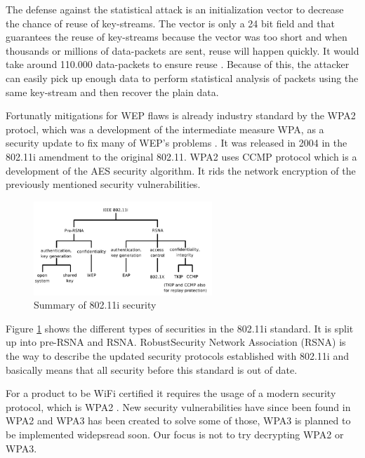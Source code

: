 The defense against the statistical attack is an initialization vector to decrease the chance of reuse of key-streams. The vector is only a 24 bit field and that guarantees the reuse of key-streams because the vector was too short and when thousands or millions of data-packets are sent, reuse will happen quickly. It would take around 110.000 data-packets to ensure reuse \cite{Random_map}. Because of this, the attacker can easily pick up enough data to perform statistical analysis of packets using the same key-stream and then recover the plain data.

Fortunatly mitigations for WEP flaws is already industry standard by the WPA2 protocl, which was a development of the intermediate measure WPA, as a security update to fix many of WEP's problems \cite{WPA2_1}\cite{WEP3}. It was released in 2004 in the 802.11i amendment to the original 802.11. WPA2 uses CCMP protocol which is a development of the AES security algorithm. It rids the network encryption of the previously mentioned security vulnerabilities. 
\\
\begin{figure}[!htbp]
    \centering
    \includegraphics[width=0.6\textwidth]{Latex-Files/Billeder/802.11i security.png}
    \caption{Summary of 802.11i security \cite{WPA2_3}}
    \label{802.11 Security}
\end{figure}

Figure \ref{802.11 Security} shows the different types of securities in the 802.11i standard. It is split up into pre-RSNA and RSNA. RobustSecurity Network Association (RSNA) is the way to describe the updated security protocols established with 802.11i and basically means that all security before this standard is out of date. 

For a product to be WiFi certified it requires the usage of a modern security protocol, which is WPA2 \cite{WPA2_2}. New security vulnerabilities have since been found in WPA2 and WPA3 has been created to solve some of those, WPA3 is planned to be implemented widepsread soon. Our focus is not to try decrypting WPA2 or WPA3. 

